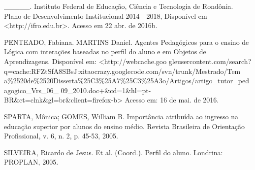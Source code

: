 \documentclass[article,12pt,onesidea,4paper,english,brazil]{abntex2}
\begin{document}
\noindent \_\_\_\_\_. Instituto Federal de Educação, Ciência e Tecnologia de Rondônia. Plano de Desenvolvimento Institucional 2014 - 2018, Disponível em <http://ifro.edu.br>. Acesso em 22 abr. de 2016b.

\sloppy
\noindent PENTEADO, Fabiana. MARTINS Daniel. Agentes Pedagógicos para o ensino de Lógica com interações baseadas no perfil do aluno e em Objetos de Aprendizagens.
Disponível em:
<http://webcache.goo gleusercontent.com/search?q=cache:RFZtSfA8SBsJ:xitaocrazy.googlecode.com/svn/trunk/Mestrado/Tem a\%2520de\%2520Disserta\%25C3\%25A7\%25C3\%25A3o/Artigos/artigo\_tutor\_pedagogico\_Vrs\_06\_ 09\_2010.doc+\&cd=1\&hl=pt-BR\&ct=clnk\&gl=br\&client=firefox-b> Acesso em: 16 de mai. de 2016.


\noindent SPARTA, Mônica; GOMES, William B. Importância atribuída ao ingresso na educação superior por alunos do ensino médio. Revista Brasileira de Orientação Profissional, v. 6, n. 2, p. 45-53, 2005.


\noindent  SILVEIRA, Ricardo de Jesus. Et al. (Coord.). Perfil do aluno. Londrina: PROPLAN, 2005.

	
\end{document}
